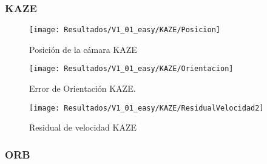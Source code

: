 \subsubsection{KAZE}


\begin{figure}[H]
	\centering
	\texttt{[image: Resultados/V1\_01\_easy/KAZE/Posicion]}
	\caption{Posición de la cámara KAZE}
	\label{imagen:Resultados/V1_01_easy/KAZE/Posicion}
\end{figure}


\begin{figure}[H]
	\centering
	\texttt{[image: Resultados/V1\_01\_easy/KAZE/Orientacion]}
	\caption[Error de Orientación KAZE]{Error de Orientación KAZE.}
	\label{imagen:Resultados/V1_01_easy/KAZE/Orientacion}
\end{figure}



\begin{figure}[H]
	\centering
	\texttt{[image: Resultados/V1\_01\_easy/KAZE/ResidualVelocidad2]}
	\caption{Residual de velocidad KAZE}
	\label{imagen:Resultados/V1_01_easy/KAZE/ResidualVelocidad}
\end{figure}



%
%
%
%
%
%
%

\subsubsection{ORB}


